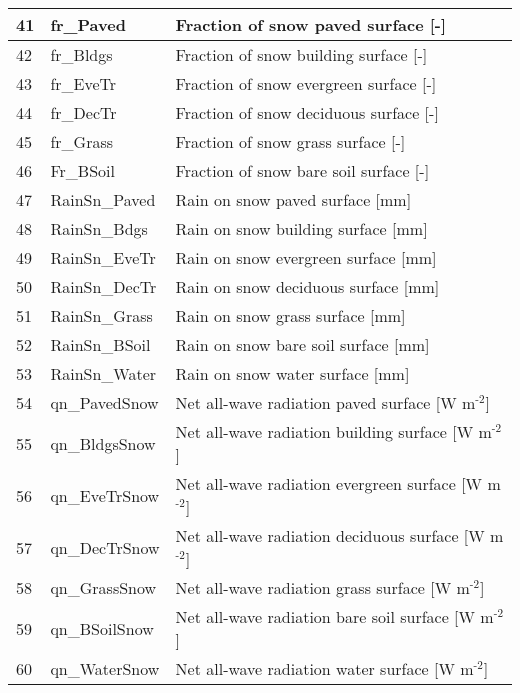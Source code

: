 \documentclass[letterpaper,10pt,english]{sphinxmanual}
\begin{document}
\begin{savenotes}
\begin{longtable}{|l|l|l|}
\\
\hline
41
&
fr\_Paved
&
Fraction of snow \textendash{} paved surface {[}-{]}
\\
\hline
42
&
fr\_Bldgs
&
Fraction of snow \textendash{} building surface {[}-{]}
\\
\hline
43
&
fr\_EveTr
&
Fraction of snow \textendash{} evergreen surface {[}-{]}
\\
\hline
44
&
fr\_DecTr
&
Fraction of snow \textendash{} deciduous surface {[}-{]}
\\
\hline
45
&
fr\_Grass
&
Fraction of snow \textendash{} grass surface {[}-{]}
\\
\hline
46
&
Fr\_BSoil
&
Fraction of snow \textendash{} bare soil surface {[}-{]}
\\
\hline
47
&
RainSn\_Paved
&
Rain on snow \textendash{} paved surface {[}mm{]}
\\
\hline
48
&
RainSn\_Bdgs
&
Rain on snow \textendash{} building surface {[}mm{]}
\\
\hline
49
&
RainSn\_EveTr
&
Rain on snow \textendash{} evergreen surface {[}mm{]}
\\
\hline
50
&
RainSn\_DecTr
&
Rain on snow \textendash{} deciduous surface {[}mm{]}
\\
\hline
51
&
RainSn\_Grass
&
Rain on snow \textendash{} grass surface {[}mm{]}
\\
\hline
52
&
RainSn\_BSoil
&
Rain on snow \textendash{} bare soil surface {[}mm{]}
\\
\hline
53
&
RainSn\_Water
&
Rain on snow \textendash{} water surface {[}mm{]}
\\
\hline
54
&
qn\_PavedSnow
&
Net all-wave radiation \textendash{} paved surface {[}W m$^{\text{-2}}${]}
\\
\hline
55
&
qn\_BldgsSnow
&
Net all-wave radiation \textendash{} building surface {[}W m$^{\text{-2}}${]}
\\
\hline
56
&
qn\_EveTrSnow
&
Net all-wave radiation \textendash{} evergreen surface {[}W m$^{\text{-2}}${]}
\\
\hline
57
&
qn\_DecTrSnow
&
Net all-wave radiation \textendash{} deciduous surface {[}W m$^{\text{-2}}${]}
\\
\hline
58
&
qn\_GrassSnow
&
Net all-wave radiation \textendash{} grass surface {[}W m$^{\text{-2}}${]}
\\
\hline
59
&
qn\_BSoilSnow
&
Net all-wave radiation \textendash{} bare soil surface {[}W m$^{\text{-2}}${]}
\\
\hline
60
&
qn\_WaterSnow
&
Net all-wave radiation \textendash{} water surface {[}W m$^{\text{-2}}${]}

\end{longtable}
\end{savenotes}
\end{document}
